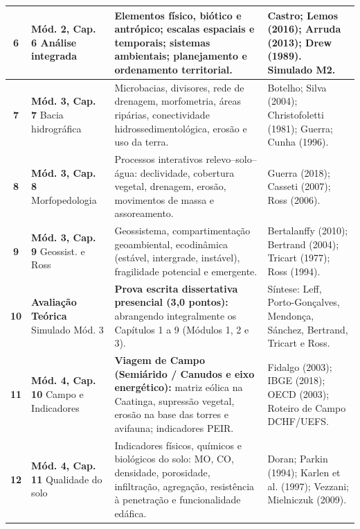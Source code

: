 \begin{longtable}{@{}c p{2.9cm} p{5.5cm} p{4.4cm}@{}}
  \rowcolor{bgGray}
  \textbf{6} & \textbf{Mód. 2, Cap. 6} \newline Análise integrada & Elementos físico, biótico e antrópico; escalas espaciais e temporais; sistemas ambientais; planejamento e ordenamento territorial. & Castro; Lemos (2016); Arruda (2013); Drew (1989). \textbf{Simulado M2.} \\
  \midrule
  \textbf{7} & \textbf{Mód. 3, Cap. 7} \newline Bacia hidrográfica & Microbacias, divisores, rede de drenagem, morfometria, áreas ripárias, conectividade hidrossedimentológica, erosão e uso da terra. & Botelho; Silva (2004); Christofoletti (1981); Guerra; Cunha (1996). \\
  \rowcolor{bgGray}
  \textbf{8} & \textbf{Mód. 3, Cap. 8} \newline Morfopedologia & Processos interativos relevo–solo–água: declividade, cobertura vegetal, drenagem, erosão, movimentos de massa e assoreamento. & Guerra (2018); Casseti (2007); Ross (2006). \\
  \textbf{9} & \textbf{Mód. 3, Cap. 9} \newline Geossist. e Ross & Geossistema, compartimentação geoambiental, ecodinâmica (estável, intergrade, instável), fragilidade potencial e emergente. & Bertalanffy (2010); Bertrand (2004); Tricart (1977); Ross (1994). \\
  \rowcolor{bgTeal}
  \textbf{10} & \textbf{Avaliação Teórica} \newline Simulado Mód. 3 & \textbf{Prova escrita dissertativa presencial (3,0 pontos):} abrangendo integralmente os Capítulos 1 a 9 (Módulos 1, 2 e 3). & Síntese: Leff, Porto-Gonçalves, Mendonça, Sánchez, Bertrand, Tricart e Ross. \\
  \midrule
  \textbf{11} & \textbf{Mód. 4, Cap. 10} \newline Campo e Indicadores & \textbf{Viagem de Campo (Semiárido / Canudos e eixo energético):} matriz eólica na Caatinga, supressão vegetal, erosão na base das torres e avifauna; indicadores PEIR. & Fidalgo (2003); IBGE (2018); OECD (2003); Roteiro de Campo DCHF/UEFS. \\
  \rowcolor{bgGray}
  \textbf{12} & \textbf{Mód. 4, Cap. 11} \newline Qualidade do solo & Indicadores físicos, químicos e biológicos do solo: MO, CO, densidade, porosidade, infiltração, agregação, resistência à penetração e funcionalidade edáfica. & Doran; Parkin (1994); Karlen et al. (1997); Vezzani; Mielniczuk (2009). \\

\end{longtable}
